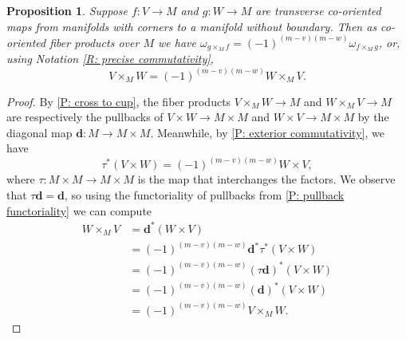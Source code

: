 \documentclass[12pt]{article}
\theoremstyle{plain}
\newtheorem{proposition}[theorem]{Proposition}
\theoremstyle{definition}
\theoremstyle{remark}
\newcommand{\diag}{\mathbf{d}}
\begin{document}
\begin{proposition}\label{P: graded comm}
	Suppose $f \colon V \to M$ and $g \colon W \to M$ are transverse co-oriented maps from manifolds with corners to a manifold without boundary.
	Then as co-oriented fiber products over $M$ we have $\omega_{g \times_M f} = (-1)^{(m-v)(m-w)} \omega_{f \times_M g}$, or, using Notation \ref{R: precise commutativity},
	$$V \times_M W = (-1)^{(m-v)(m-w)} W \times_M V.$$
\end{proposition}
\begin{proof}		
	By \cref{P: cross to cup}, the fiber products $V \times_M W \to M$ and $W \times_M V \to M$ are respectively the pullbacks of $V \times W \to M \times M$ and $W \times V \to M \times M$ by the diagonal map $\diag \colon M \to M \times M$. 
	Meanwhile, by \cref{P: exterior commutativity}, we have 
	$$\tau^*(V \times W) = (-1)^{(m-v)(m-w)}W \times V,$$
	where $\tau \colon M \times M \to M \times M$ is the map that interchanges the factors. 
	We observe that $\tau \diag = \diag$, so using the functoriality of pullbacks from \cref{P: pullback functoriality} we can compute
	\begin{align*}
	W \times_M V &= \diag^*(W \times V)\\
	&= (-1)^{(m-v)(m-w)} \diag^* \tau^*(V \times W)\\
	&= (-1)^{(m-v)(m-w)}(\tau \diag)^*(V \times W)\\
	&= (-1)^{(m-v)(m-w)}(\diag)^*(V \times W)\\
	&= (-1)^{(m-v)(m-w)} V \times_M W.
	\end{align*} 
\end{proof}




\end{document}
